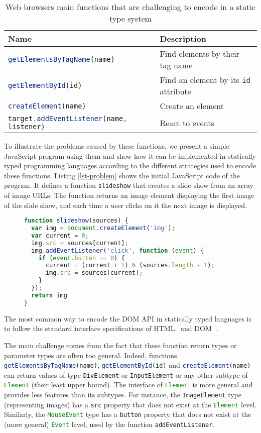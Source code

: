 \documentclass{llncs}
\newcommand{\jscode}[1]{\lstinline[language=JavaScript]|#1|}
\begin{document}
\begin{table}
 \centering
 \begin{tabular}{ll}
  \hline
  Name & Description \\
  \hline
  \jscode{getElementsByTagName(name)} & Find elements by their tag name \\
  \jscode{getElementById(id)} & Find an element by its \jscode{id} attribute \\
  \jscode{createElement(name)} & Create an element \\
  \jscode{target.addEventListener(name, listener)} & React to events \\
  \hline
 \end{tabular}

 \label{table-dom-api}
 \caption{Web browsers main functions that are challenging to encode in a static type system}
\end{table}

To illustrate the problems caused by these functions, we present a simple JavaScript program using them and show how it can be implemented in statically typed programming languages according to the different strategies used to encode these functions. Listing \ref{lst-problem} shows the initial JavaScript code of the program. It defines a function \jscode{slideshow} that creates a slide show from an array of image URLs. The function returns an image element displaying the first image of the slide show, and each time a user clicks on it the next image is displayed.

\begin{figure}
\begin{lstlisting}[label=lst-problem,language=JavaScript,caption=JavaScript function creating a slide show from an array of image URLs]
function slideshow(sources) {
  var img = document.createElement('img');
  var current = 0;
  img.src = sources[current];
  img.addEventListener('click', function (event) {
    if (event.button == 0) {
      current = (current + 1) % (sources.length - 1);
      img.src = sources[current];
    }
  });
  return img
}
\end{lstlisting}
\end{figure}

The most common way to encode the DOM API in statically typed languages is to follow the standard interface specifications of HTML~\cite{Raggett99_HTML} and DOM~\cite{w3c2004document}. 

The main challenge comes from the fact that these function return types or parameter types are often too general. Indeed, functions \jscode{getElementsByTagName(name)}, \jscode{getElementById(id)} and \jscode{createElement(name)} can return values of type \jscode{DivElement} or \jscode{InputElement} or any other subtype of \jscode{Element} (their least upper bound). The interface of \jscode{Element} is more general and provides less features than its subtypes. For instance, the \jscode{ImageElement} type (representing images) has a \jscode{src} property that does not exist at the \jscode{Element} level. Similarly, the \jscode{MouseEvent} type has a \jscode{button} property that does not exist at the (more general) \jscode{Event} level, used by the function \jscode{addEventListener}.
\end{document}
